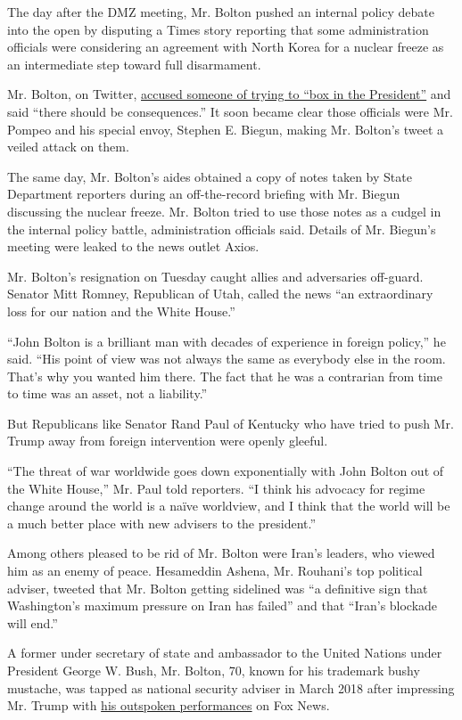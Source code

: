 The day after the DMZ meeting, Mr. Bolton pushed an internal policy
debate into the open by disputing a Times story reporting that some
administration officials were considering an agreement with North Korea
for a nuclear freeze as an intermediate step toward full disarmament.

Mr. Bolton, on Twitter,
\href{https://twitter.com/AmbJohnBolton/status/1145646367865528320?s=20}{accused
someone of trying to ``box in the President''} and said ``there should
be consequences.'' It soon became clear those officials were Mr. Pompeo
and his special envoy, Stephen E. Biegun, making Mr. Bolton's tweet a
veiled attack on them.

The same day, Mr. Bolton's aides obtained a copy of notes taken by State
Department reporters during an off-the-record briefing with Mr. Biegun
discussing the nuclear freeze. Mr. Bolton tried to use those notes as a
cudgel in the internal policy battle, administration officials said.
Details of Mr. Biegun's meeting were leaked to the news outlet Axios.

Mr. Bolton's resignation on Tuesday caught allies and adversaries
off-guard. Senator Mitt Romney, Republican of Utah, called the news ``an
extraordinary loss for our nation and the White House.''

``John Bolton is a brilliant man with decades of experience in foreign
policy,'' he said. ``His point of view was not always the same as
everybody else in the room. That's why you wanted him there. The fact
that he was a contrarian from time to time was an asset, not a
liability.''

But Republicans like Senator Rand Paul of Kentucky who have tried to
push Mr. Trump away from foreign intervention were openly gleeful.

``The threat of war worldwide goes down exponentially with John Bolton
out of the White House,'' Mr. Paul told reporters. ``I think his
advocacy for regime change around the world is a naïve worldview, and I
think that the world will be a much better place with new advisers to
the president.''

Among others pleased to be rid of Mr. Bolton were Iran's leaders, who
viewed him as an enemy of peace. Hesameddin Ashena, Mr. Rouhani's top
political adviser, tweeted that Mr. Bolton getting sidelined was ``a
definitive sign that Washington's maximum pressure on Iran has failed''
and that ``Iran's blockade will end.''

A former under secretary of state and ambassador to the United Nations
under President George W. Bush, Mr. Bolton, 70, known for his trademark
bushy mustache, was tapped as national security adviser in March 2018
after impressing Mr. Trump with
\href{https://www.nytimes.com/2018/04/08/us/politics/john-bolton-trump.html}{his
outspoken performances} on Fox News.

